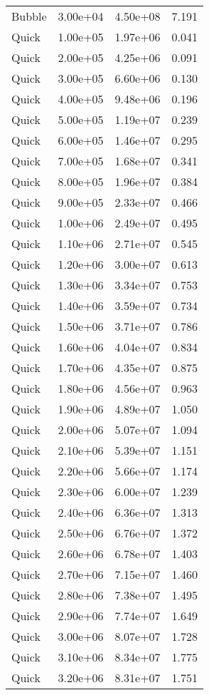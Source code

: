\begin{table}
\begin{tabular}{llll}
Bubble & 3.00e+04 & 4.50e+08 & 7.191 \\
Quick & 1.00e+05 & 1.97e+06 & 0.041 \\
Quick & 2.00e+05 & 4.25e+06 & 0.091 \\
Quick & 3.00e+05 & 6.60e+06 & 0.130 \\
Quick & 4.00e+05 & 9.48e+06 & 0.196 \\
Quick & 5.00e+05 & 1.19e+07 & 0.239 \\
Quick & 6.00e+05 & 1.46e+07 & 0.295 \\
Quick & 7.00e+05 & 1.68e+07 & 0.341 \\
Quick & 8.00e+05 & 1.96e+07 & 0.384 \\
Quick & 9.00e+05 & 2.33e+07 & 0.466 \\
Quick & 1.00e+06 & 2.49e+07 & 0.495 \\
Quick & 1.10e+06 & 2.71e+07 & 0.545 \\
Quick & 1.20e+06 & 3.00e+07 & 0.613 \\
Quick & 1.30e+06 & 3.34e+07 & 0.753 \\
Quick & 1.40e+06 & 3.59e+07 & 0.734 \\
Quick & 1.50e+06 & 3.71e+07 & 0.786 \\
Quick & 1.60e+06 & 4.04e+07 & 0.834 \\
Quick & 1.70e+06 & 4.35e+07 & 0.875 \\
Quick & 1.80e+06 & 4.56e+07 & 0.963 \\
Quick & 1.90e+06 & 4.89e+07 & 1.050 \\
Quick & 2.00e+06 & 5.07e+07 & 1.094 \\
Quick & 2.10e+06 & 5.39e+07 & 1.151 \\
Quick & 2.20e+06 & 5.66e+07 & 1.174 \\
Quick & 2.30e+06 & 6.00e+07 & 1.239 \\
Quick & 2.40e+06 & 6.36e+07 & 1.313 \\
Quick & 2.50e+06 & 6.76e+07 & 1.372 \\
Quick & 2.60e+06 & 6.78e+07 & 1.403 \\
Quick & 2.70e+06 & 7.15e+07 & 1.460 \\
Quick & 2.80e+06 & 7.38e+07 & 1.495 \\
Quick & 2.90e+06 & 7.74e+07 & 1.649 \\
Quick & 3.00e+06 & 8.07e+07 & 1.728 \\
Quick & 3.10e+06 & 8.34e+07 & 1.775 \\
Quick & 3.20e+06 & 8.31e+07 & 1.751 \\

\end{tabular}
\end{table}
